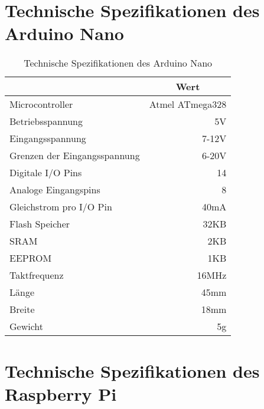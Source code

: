 \section{Technische Spezifikationen des Arduino Nano}
\label{app:arduino}

\begin{table}[ht]
\caption{Technische Spezifikationen des Arduino Nano}
\begin{center}
\begin{tabular}{|l|r|}
\hline
\rowcolor{lightgray} \multicolumn{1}{|c|}{\textbf{Spezifikation}} & \multicolumn{1}{|c|}{\textbf{Wert}}\\
\hline
Microcontroller & Atmel ATmega328\\
\hline
Betriebsspannung & 5V\\
\hline
Eingangsspannung & 7-12V\\
\hline
Grenzen der Eingangsspannung & 6-20V\\
\hline
Digitale I/O Pins & 14\\
\hline
Analoge Eingangspins & 8\\
\hline
Gleichstrom pro I/O Pin & 40mA\\
\hline
Flash Speicher & 32KB\\
\hline
SRAM & 2KB \\
\hline
EEPROM & 1KB\\
\hline
Taktfrequenz & 16MHz\\
\hline
Länge & 45mm\\
\hline
Breite & 18mm\\
\hline
Gewicht & 5g\\
\hline
\end{tabular}
\end{center}
\label{tab:arduino}
\end{table}

\clearpage{}

\section{Technische Spezifikationen des Raspberry Pi}
\label{app:raspberry}

